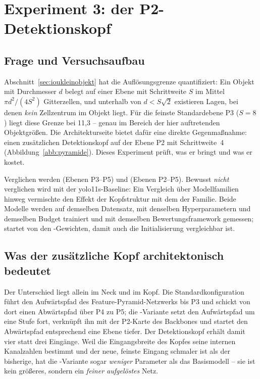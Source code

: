 \section{Experiment 3: der P2-Detektionskopf}
\label{sec:p2}

\subsection{Frage und Versuchsaufbau}

Abschnitt~\ref{sec:ioukleinobjekt} hat die Auflösungsgrenze quantifiziert: Ein
Objekt mit Durchmesser $d$ belegt auf einer Ebene mit Schrittweite $S$ im Mittel
$\pi d^2/(4S^2)$ Gitterzellen, und unterhalb von $d < S\sqrt{2}$ existieren
Lagen, bei denen \emph{kein} Zellzentrum im Objekt liegt. Für die feinste
Standardebene P3 ($S = 8$) liegt diese Grenze bei 11,3\px{} -- genau im Bereich
der hier auftretenden Objektgrößen. Die Architekturseite bietet dafür eine
direkte Gegenmaßnahme: einen zusätzlichen Detektionskopf auf der Ebene P2 mit
Schrittweite~4 (Abbildung~\ref{abb:pyramide}). Dieses Experiment prüft, was er
bringt und was er kostet.

Verglichen werden  (Ebenen P3--P5) und 
(Ebenen P2--P5). Bewusst \emph{nicht} verglichen wird mit der yolo11s-Baseline:
Ein Vergleich über Modellfamilien hinweg vermischte den Effekt der Kopfstruktur
mit dem der Familie. Beide Modelle werden auf demselben Datensatz, mit denselben
Hyperparametern und demselben Budget trainiert und mit demselben
Bewertungsframework gemessen;  startet von den
-Gewichten, damit auch die Initialisierung vergleichbar ist.

\subsection{Was der zusätzliche Kopf architektonisch bedeutet}

Der Unterschied liegt allein im Neck und im Kopf. Die
Standardkonfiguration führt den Aufwärtspfad des Feature-Pyramid-Netzwerks
\parencite{lin2017fpn} bis P3 und schickt von dort einen Abwärtspfad über P4 zu
P5; die -Variante setzt den Aufwärtspfad um eine Stufe fort,
verknüpft ihn mit der P2-Karte des Backbones und startet den Abwärtspfad
entsprechend eine Ebene tiefer. Der Detektionskopf erhält damit vier statt drei
Eingänge. Weil die Eingangsbreite des Kopfes seine internen Kanalzahlen bestimmt
und der neue, feinste Eingang schmaler ist als der bisherige, hat die
-Variante sogar \emph{weniger} Parameter als das Basismodell --
sie ist kein größeres, sondern ein \emph{feiner aufgelöstes} Netz.

